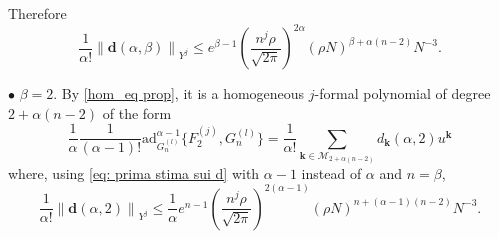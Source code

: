 \documentclass[a4paper,10pt,reqno]{article}
\theoremstyle{definition}
\theoremstyle{plain}
\theoremstyle{plain}
\theoremstyle{definition}
\theoremstyle{plain}
\theoremstyle{plain}
\theoremstyle{plain}
\theoremstyle{definition}
\theoremstyle{definition}
\newcommand{\norm}[1]{\left\lVert #1 \right\rVert}
\def \M{\mathcal{M}}
\def \k{\bm{k}}
\begin{document}
Therefore
\begin{equation}
\frac{1}{\alpha !} \norm{\bm{d}(\alpha,\beta)}_{Y^j} \le e^{\beta-1} \left ( \frac{n^j \rho}{\sqrt{2\pi}} \right )^{2\alpha} (\rho N)^{\beta + \alpha(n-2)}N^{-3}.
\label{eq: prima stima sui d}
\end{equation}

\medskip 

\noindent $\bullet$ $\beta=2$. By \eqref{hom_eq prop}, it is a homogeneous $j$-formal polynomial of degree $2 + \alpha(n-2)$ of the form
\[
\frac{1}{\alpha} \frac{1}{(\alpha-1)!} \mathrm{ad}_{G_n^{(l)}}^{\alpha-1} \{ F_2^{(j)} , G_n^{(l)} \} = \frac{1}{\alpha !} \sum_{\k \in \M_{2 + \alpha(n-2)}} d_{\k}(\alpha,2) u^{\k}
\]
where, using \eqref{eq: prima stima sui d} with $\alpha-1$ instead of $\alpha$ and $n=\beta$, 
\begin{equation}
\frac{1}{\alpha !} \norm{\bm{d}(\alpha,2)}_{Y^j} \le \frac{1}{\alpha} e^{n-1} \left ( \frac{n^j \rho}{\sqrt{2\pi}} \right )^{2(\alpha-1)} (\rho N)^{n+(\alpha-1)(n-2)} N^{-3}.
\label{eq: seconda stima sui d}
\end{equation}
\end{document}
